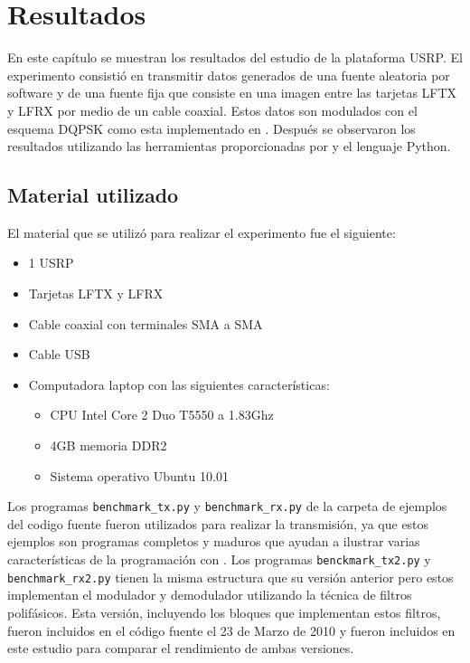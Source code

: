 \chapter{Resultados}
\label{ch:resultados}

En este cap\'itulo se muestran los resultados del estudio de la plataforma USRP. El experimento
consisti\'o en transmitir datos generados de una fuente aleatoria por software y de una fuente fija
que consiste en una imagen entre las tarjetas LFTX y LFRX por medio de un cable coaxial. Estos
datos son modulados con el esquema DQPSK como esta implementado en \gnuradio. Despu\'es se
observaron los resultados utilizando las herramientas proporcionadas por \gnuradio y el lenguaje Python.

\section{Material utilizado}
El material que se utiliz\'o para realizar el experimento fue el siguiente:

\begin{itemize}
  \item 1 USRP
  \item Tarjetas LFTX y LFRX
  \item Cable coaxial con terminales SMA a SMA
  \item Cable USB
  \item Computadora laptop con las siguientes caracter\'isticas:
  \begin {itemize}
    \item CPU Intel Core 2 Duo T5550 a 1.83Ghz
    \item 4GB memoria DDR2
    \item Sistema operativo Ubuntu 10.01
  \end{itemize}
\end{itemize}

Los programas \verb|benchmark_tx.py| y \verb|benchmark_rx.py| de la carpeta de ejemplos del codigo
fuente fueron utilizados para realizar la transmisi\'on, ya que estos ejemplos son programas
completos y maduros que ayudan a ilustrar varias caracter\'isticas de la programaci\'on con
\gnuradio. Los programas \verb|benckmark_tx2.py| y \verb|benchmark_rx2.py| tienen la misma
estructura que su versi\'on anterior pero estos implementan el modulador y demodulador utilizando la
t\'ecnica de filtros polif\'asicos. Esta versi\'on, incluyendo los bloques que implementan estos
filtros, fueron incluidos en el c\'odigo fuente el 23 de Marzo de 2010 y fueron incluidos en este
estudio para comparar el rendimiento de ambas versiones.


